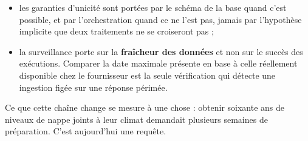 \begin{itemize}
  \item les garanties d'unicité sont portées par le schéma de la base quand c'est possible, et
  par l'orchestration quand ce ne l'est pas, jamais par l'hypothèse implicite que deux
  traitements ne se croiseront pas ;
  \item la surveillance porte sur la \textbf{fraîcheur des données} et non sur le succès des
  exécutions. Comparer la date maximale présente en base à celle réellement disponible chez le
  fournisseur est la seule vérification qui détecte une ingestion figée sur une réponse périmée.
\end{itemize}

Ce que cette chaîne change se mesure à une chose : obtenir soixante ans de niveaux de nappe
joints à leur climat demandait plusieurs semaines de préparation. C'est aujourd'hui une requête.
